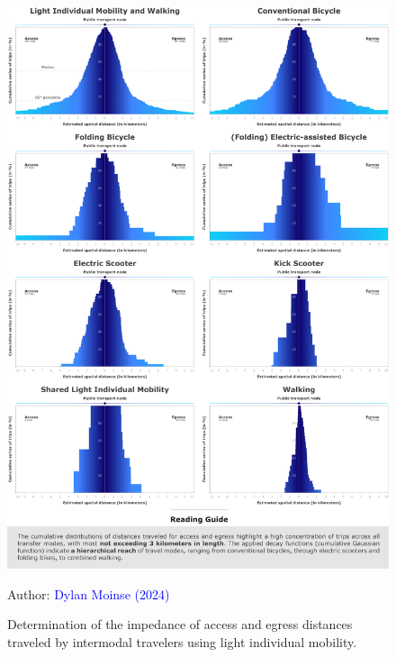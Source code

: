 \begin{refsegment}
\begin{figure}[h!]\vspace*{4pt}
    \caption{Determination of the impedance of access and egress distances traveled by intermodal travelers using light individual mobility.}
    \label{fig-chap5:impedance-distances}
    \centerline{\includegraphics[width=1\columnwidth]{src/Figures/Chap-5/EN_Distances_Impedance.pdf}}
    \vspace{5pt}
    \begin{flushright}\scriptsize{
    Author: \textcolor{blue}{Dylan Moinse (2024)}
    }\end{flushright}
\end{figure}


\end{refsegment}
